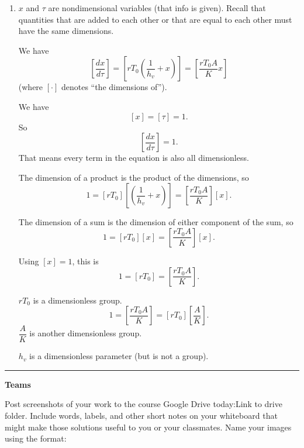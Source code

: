 \documentclass[12pt]{amsart}
\theoremstyle{conjecture}
\theoremstyle{definition}
\theoremstyle{question}
\theoremstyle{theorem}
\newcommand{\sectionrule}{%
    \vspace{0.3em}
    \hrule
    \vspace{0.8em}
}
\begin{document}
    \begin{enumerate}
        \item $x$ and $\tau$ are nondimensional variables (that info is given). Recall that quantities that are added
        to each other or that are equal to each other must have the same dimensions.

        We have
        \[
            \left[\frac{dx}{d\tau}\right]
            =
            \left[
                rT_0\left(\frac{1}{h_v}+x\right)
            \right]
            =
            \left[
                \frac{rT_0A}{K}x
            \right]
        \]
        (where $[\cdot]$ denotes ``the dimensions of'').

        We have
        \[
            [x]=[\tau]=1.
        \]
        So
        \[
            \left[\frac{dx}{d\tau}\right]=1.
        \]
        That means every term in the equation is also all dimensionless.

        The dimension of a product is the product of the dimensions, so
        \[
            1
            =
            [rT_0]
            \left[
                \left(\frac{1}{h_v}+x\right)
            \right]
            =
            \left[
                \frac{rT_0A}{K}
            \right]
            [x].
        \]

        The dimension of a sum is the dimension of either component of the sum, so
        \[
            1
            =
            [rT_0][x]
            =
            \left[
                \frac{rT_0A}{K}
            \right]
            [x].
        \]

        \newpage

        Using $[x]=1$, this is
        \[
            1=[rT_0]
            =
            \left[
                \frac{rT_0A}{K}
            \right].
        \]

        $rT_0$ is a dimensionless group.
        \[
            1
            =
            \left[
                \frac{rT_0A}{K}
            \right]
            =
            [rT_0]
            \left[
                \frac{A}{K}
            \right].
        \]
        $\dfrac{A}{K}$ is another dimensionless group.

        $h_v$ is a dimensionless parameter (but is not a group).
    \end{enumerate}

    \sectionrule

    \newpage

    {\Large\textbf{Teams}}

    Post screenshots of your work to the course Google Drive today:Link to drive folder. Include words,
    labels, and other short notes on your whiteboard that might make those solutions useful to you or
    your classmates. Name your images using the format:
\end{document}
